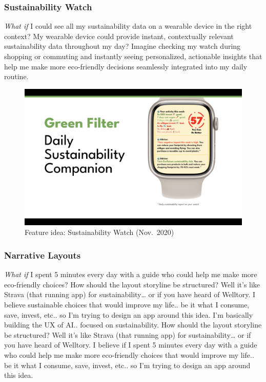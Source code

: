 \documentclass[
  12pt,
  letterpaper,
  DIV=11,
  numbers=noendperiod]{scrartcl}
\begin{document}
\subsubsection{Sustainability Watch}\label{sustainability-watch}

\emph{What if} I could see all my sustainability data on a wearable
device in the right context? My wearable device could provide instant,
contextually relevant sustainability data throughout my day? Imagine
checking my watch during shopping or commuting and instantly seeing
personalized, actionable insights that help me make more eco-friendly
decisions seamlessly integrated into my daily routine.

\begin{figure}[H]

{\centering \includegraphics[width=0.5\linewidth,height=\textheight,keepaspectratio]{./images/prototypes/ai-watch.png}

}

\caption{Feature idea: Sustainability Watch (Nov.~2020)}

\end{figure}%

\subsubsection{Narrative Layouts}\label{narrative-layouts}

\emph{What if} I spent 5 minutes every day with a guide who could help
me make more eco-friendly choices? How should the layout storyline be
structured? Well it's like Strava (that running app) for
sustainability\ldots{} or if you have heard of Welltory. I believe
sustainable choices that would improve my life.. be it what I consume,
save, invest, etc.. so I'm trying to design an app around this idea. I'm
basically building the UX of AI.. focused on sustainability. How should
the layout storyline be structured? Well it's like Strava (that running
app) for sustainability\ldots{} or if you have heard of Welltory. I
believe if I spent 5 minutes every day with a guide who could help me
make more eco-friendly choices that would improve my life.. be it what I
consume, save, invest, etc.. so I'm trying to design an app around this
idea.
\end{document}
